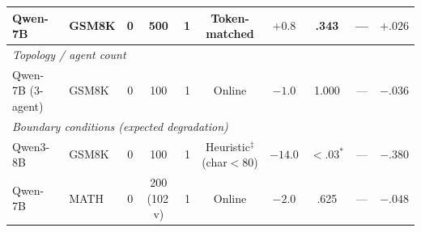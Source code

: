 \begin{table}[ht]
{\begin{tabular}{llccrccccc}
\midrule
Qwen-7B & GSM8K & 0 & 500 & 1 & Token-matched & $+0.8$ & .343 & --- & $+.026$ \\
\midrule
\multicolumn{10}{l}{\emph{Topology / agent count}} \\
\midrule
Qwen-7B (3-agent) & GSM8K & 0 & 100 & 1 & Online & $-1.0$ & 1.000 & --- & $-.036$ \\
\midrule
\multicolumn{10}{l}{\emph{Boundary conditions (expected degradation)}} \\
\midrule
Qwen3-8B & GSM8K & 0 & 100 & 1 & Heuristic$^\ddagger$ (char$<$80) & $-14.0$ & ${<}.03^{*}$ & --- & $-.380$ \\
Qwen-7B & MATH & 0 & 200 (102\,v) & 1 & Online & $-2.0$ & .625 & --- & $-.048$ \\
\bottomrule
\end{tabular}%
}
\end{table}
